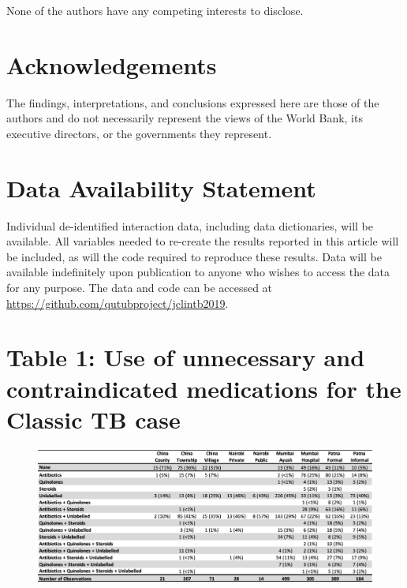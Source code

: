 \documentclass[fleqn,10pt]{wlscirep}
\begin{document}
None of the authors have any competing interests to disclose.

\section*{Acknowledgements}

The findings, interpretations, and conclusions expressed here are those of the authors and do not necessarily represent the views of the World Bank, its executive directors, or the governments they represent.

\section*{Data Availability Statement}

Individual de-identified interaction data, including data dictionaries, will be available. All variables needed to re-create the results reported in this article will be included, as will the code required to reproduce these results. Data will be available indefinitely upon publication to anyone who wishes to access the data for any purpose. The data and code can be accessed at \url{https://github.com/qutubproject/jclintb2019}.


\newpage



\newpage

\section*{Table 1: Use of unnecessary and contraindicated medications for the Classic TB case}

\begin{figure}[h]
\centering
\includegraphics[width=1\textwidth]{meds.png}
\end{figure}
\end{document}
